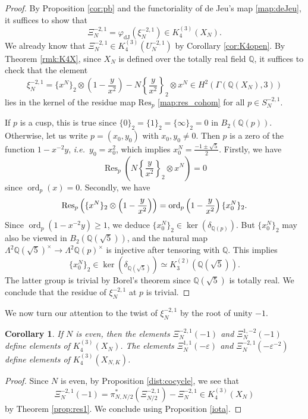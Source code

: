 \documentclass[11pt,a4,leqno]{amsart}
\theoremstyle{my theoremstyle}
\newtheorem{cor}[thm]{Corollary}
\theoremstyle{dfn}
\theoremstyle{remark}
\renewcommand{\1}{\mathbbm{1}}
\newcommand{\Q}{\mathbb{Q}}
\newcommand{\e}{\varepsilon}
\numberwithin{equation}{section}
\newcommand{\ord}{\operatorname{ord}}
\begin{document}
\begin{proof}
By Proposition \ref{cor:pb} and the functoriality of de Jeu's map \eqref{map:deJeu}, it suffices to show that
$$\Xi_N^{-2, 1}=\varphi_{\mathrm{dJ}}(\xi_N^{-2, 1}) \in K_4^{(3)}(X_N). $$  
We already know that $\Xi_N^{-2,1}\in K_4^{(3)}(U^{-2,1}_N)$ by Corollary \ref{cor:K4open}. By Theorem \ref{rmk:K4X}, since $X_N$ is defined over the totally real field $\Q$, it suffices to check that the element 
\[
\xi^{-2,1}_N=\{x^N\}_2 \otimes \left(1- \frac{y}{x^2} \right) - N \left\{\dfrac{y}{x^2} \right\}_2 \otimes x^N \in H^2(\Gamma(\Q(X_N),3))
\]
lies in the kernel of the residue map $\mathrm{Res}_p$ \eqref{map:res_cohom} for all $p\in S^{-2,1}_N$.

If $p$ is a cusp, this is true since $\{0\}_2=\{1\}_2=\{\infty\}_2=0$ in $B_2(\Q(p))$. Otherwise, let us write $p = (x_0,y_0)$ with $x_0, y_0 \neq 0$. Then $p$ is a zero of the function $1-x^{-2}y$, \emph{i.e.}~$y_0 = x_0^2$, which implies $x_0^N=\frac{-1\pm \sqrt{5}}{2}$. Firstly, we have
$$\operatorname{Res}_p \left(N \left\{\dfrac{y}{x^2} \right\}_2 \otimes x^N \right)=0 $$
since $\ord_p(x)=0$. Secondly, we have
\begin{align*}
{\rm Res}_p\left(\{x^N\}_2 \otimes \left(1- \frac{y}{x^2} \right) \right)= \ord_p\left(1- \frac{y}{x^2} \right)  \{x_0^N\}_2.  
\end{align*}
Since $\ord_p(1-x^{-2}y) \geq 1$, we deduce $\{x_0^N\}_2 \in \ker(\delta_{\Q(p)})$. But $\{x_0^N\}_2$ may also be viewed in $B_2(\Q(\sqrt{5}))$, and the natural map $\Lambda^2 \Q(\sqrt{5})^\times \to \Lambda^2 \Q(p)^\times$ is injective after tensoring with $\Q$. This implies
$$\{ x_0^N \}_2\in \ker(\delta_{\Q(\sqrt{5})})\simeq K_3^{(2)}(\Q(\sqrt{5})).$$
The latter group is trivial by Borel's theorem \cite[Theorem IV.1.18]{Wei13} 
since $\Q(\sqrt{5})$ is totally real. We conclude that the residue of $\xi_N^{-2,1}$ at $p$ is trivial.
\end{proof}

We now turn our attention to the twist of $\xi_N^{-2,1}$ by the root of unity $-1$.

\begin{cor} 
If $N$ is even, then the elements $\Xi^{-2, 1}_N(-1)$ and $\Xi^{1, -2}_N(-1)$ define elements of $K_4^{(3)}(X_N)$. The elements $\Xi_N^{1, 1}(-\e)$ and $\Xi_N^{-2, 1}(- \e^{-2})$ define elements of $K_4^{(3)}(X_{N,K})$.
\end{cor}

\begin{proof}
Since $N$ is even, by Proposition \ref{dist:cocycle}, we see that
    \[
    \Xi_N^{-2,1}(-1)=\pi^*_{N,N/2}(\Xi^{-2,1}_{N/2})-\Xi_N^{-2,1} \in K_4^{(3)}(X_N)
    \]
    by Theorem \ref{prop:res1}. We conclude using Proposition \ref{iota}.
\end{proof}
\end{document}
